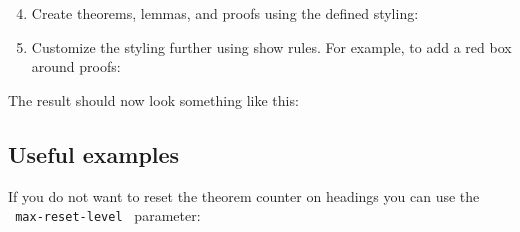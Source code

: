 \begin{Shaded}
\begin{Highlighting}[]
\end{Highlighting}
\end{Shaded}

\begin{enumerate}
\setcounter{enumi}{3}
\tightlist
\item
  Create theorems, lemmas, and proofs using the defined styling:
\end{enumerate}

\begin{Shaded}
\begin{Highlighting}[]
\NormalTok{\#theorem(name: "Some theorem")[}
\NormalTok{]\textless{}thm\textgreater{}}

\NormalTok{\#proof[}
\NormalTok{]\textless{}proof\textgreater{}}

\end{Highlighting}
\end{Shaded}

\begin{enumerate}
\setcounter{enumi}{4}
\tightlist
\item
  Customize the styling further using show rules. For example, to add a
  red box around proofs:
\end{enumerate}

\begin{Shaded}
\begin{Highlighting}[]
\NormalTok{)}
\end{Highlighting}
\end{Shaded}

The result should now look something like this:


\subsection{Useful examples}\label{useful-examples}

If you do not want to reset the theorem counter on headings you can use
the \texttt{\ max-reset-level\ } parameter:

